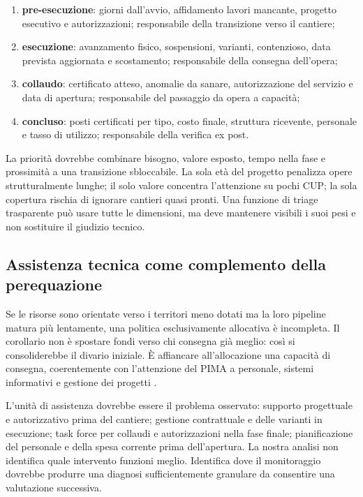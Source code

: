 \documentclass[10pt,a4paper]{article}
\begin{document}
\begin{enumerate}
  \item \textbf{pre-esecuzione}: giorni dall'avvio, affidamento lavori mancante, progetto esecutivo e autorizzazioni; responsabile della transizione verso il cantiere;
  \item \textbf{esecuzione}: avanzamento fisico, sospensioni, varianti, contenzioso, data prevista aggiornata e scostamento; responsabile della consegna dell'opera;
  \item \textbf{collaudo}: certificato atteso, anomalie da sanare, autorizzazione del servizio e data di apertura; responsabile del passaggio da opera a capacità;
  \item \textbf{concluso}: posti certificati per tipo, costo finale, struttura ricevente, personale e tasso di utilizzo; responsabile della verifica ex post.
\end{enumerate}

La priorità dovrebbe combinare bisogno, valore esposto, tempo nella fase e prossimità a una transizione sbloccabile. La sola età del progetto penalizza opere strutturalmente lunghe; il solo valore concentra l'attenzione su pochi CUP; la sola copertura rischia di ignorare cantieri quasi pronti. Una funzione di triage trasparente può usare tutte le dimensioni, ma deve mantenere visibili i suoi pesi e non sostituire il giudizio tecnico.

\subsection{Assistenza tecnica come complemento della perequazione}

Se le risorse sono orientate verso i territori meno dotati ma la loro pipeline matura più lentamente, una politica esclusivamente allocativa è incompleta. Il corollario non è spostare fondi verso chi consegna già meglio: così si consoliderebbe il divario iniziale. È affiancare all'allocazione una capacità di consegna, coerentemente con l'attenzione del PIMA a personale, sistemi informativi e gestione dei progetti \citep{imf2022}.

L'unità di assistenza dovrebbe essere il problema osservato: supporto progettuale e autorizzativo prima del cantiere; gestione contrattuale e delle varianti in esecuzione; task force per collaudi e autorizzazioni nella fase finale; pianificazione del personale e della spesa corrente prima dell'apertura. La nostra analisi non identifica quale intervento funzioni meglio. Identifica dove il monitoraggio dovrebbe produrre una diagnosi sufficientemente granulare da consentire una valutazione successiva.
\end{document}
